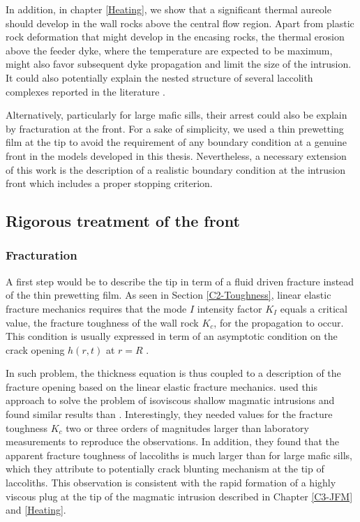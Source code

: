 In  addition, in  chapter \ref{Heating},  we show  that a  significant
thermal aureole  should develop  in the wall  rocks above  the central
flow region. Apart from plastic rock deformation that might develop in
the encasing rocks,  the thermal erosion above the  feeder dyke, where
the  temperature  are  expected  to   be  maximum,  might  also  favor
subsequent dyke  propagation and limit  the size of the  intrusion. It
could  also  potentially  explain  the  nested  structure  of  several
laccolith      complexes      reported     in      the      literature
\citep{E:2015tl,Rocchi:2010dn}.

Alternatively, particularly for large  mafic sills, their arrest could
also  be  explain  by  fracturation  at the  front.   For  a  sake  of
simplicity, we  used a thin  prewetting film at  the tip to  avoid the
requirement of any boundary condition at a genuine front in the models
developed in this thesis. Nevertheless,  a necessary extension of this
work  is the  description of  a  realistic boundary  condition at  the
intrusion front which includes a proper stopping criterion.

\subsection{Rigorous treatment of the front}
\label{sec:rigor-treatm-front}

\subsubsection*{Fracturation}
\label{sec:fracturation}

A first step  would be to describe  the tip in term of  a fluid driven
fracture  instead of  the thin  prewetting  film. As  seen in  Section
\ref{C2-Toughness},  linear elastic  fracture mechanics  requires that
the  mode $I$  intensity factor  $K_I$  equals a  critical value,  the
fracture toughness  of the wall  rock $K_{c}$, for the  propagation to
occur. This  condition is usually  expressed in term of  an asymptotic
condition    on    the    crack     opening    $h(r,t)$    at    $r=R$
\citep{Savitski:2002gy,Bunger:2005em,Bunger:2007vs,Detournay:2014fk}.

In  such  problem,  the  thickness  equation  is  thus  coupled  to  a
description  of  the fracture  opening  based  on the  linear  elastic
fracture mechanics. \citet{Bunger:2011cb} used  this approach to solve
the  problem  of  isoviscous  shallow magmatic  intrusions  and  found
similar  results  than  \citet{Michaut:2011kg}.   Interestingly,  they
needed values for the fracture toughness  $K_c$ two or three orders of
magnitudes  larger  than  laboratory  measurements  to  reproduce  the
observations.   In addition,  they  found that  the apparent  fracture
toughness of  laccoliths is  much larger than  for large  mafic sills,
which they  attribute to potentially  crack blunting mechanism  at the
tip  of laccoliths.   This observation  is consistent  with the  rapid
formation  of  a highly  viscous  plug  at  the  tip of  the  magmatic
intrusion described in Chapter \ref{C3-JFM} and \ref{Heating}.

